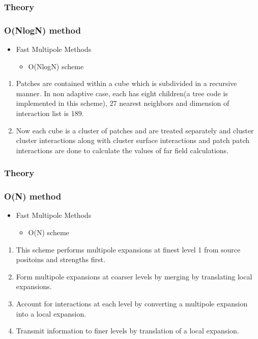 \documentclass{beamer}
\begin{document}
\begin{frame}
\frametitle{Theory}
\subsubsection{O(NlogN) method}
\begin{itemize}
\item Fast Multipole Methods
\begin{itemize}
\item O(NlogN) scheme
\end{itemize}
\end{itemize}
\begin{enumerate}
\item Patches are contained within a cube which is subdivided in a recursive manner. In non adaptive case, each has eight children(a tree code is implemented in this scheme), 27 nearest neighbors and dimension of interaction list is 189.
\item Now each cube is a cluster of patches and are treated separately and cluster cluster interactions along with cluster surface interactions and patch patch interactions are done to calculate the values of far field calculations.
\end{enumerate}
\end{frame}

\begin{frame}
\frametitle{Theory}
\subsubsection{O(N) method}
\begin{itemize}
\item Fast Multipole Methods
\begin{itemize}
\item O(N) scheme
\end{itemize}
\end{itemize}
\begin{enumerate}
\item This scheme performs multipole expansions at finest level 1 from source positoins and strengths first.
\item Form multipole expansions at coarser levels by merging by translating local expansions.
\item Account for interactions at each level by converting a multipole expansion into a local expansion. 
\item Transmit information to finer levels by translation of a local expansion.
\end{enumerate}
\end{frame}
\end{document}
